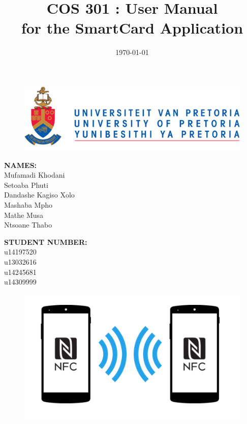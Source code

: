 \documentclass[english]{article}
\title{COS 301 : User Manual\\
	for the SmartCard Application\\
	}
\date{\today}
\begin{document}
	\maketitle
	\begin{figure}[!t]
		\includegraphics{up_logo.png}
	\end{figure}
	\begin{minipage}{0.4\textwidth}
		\begin{flushleft} \large
			\textbf{NAMES:}\\[0.4cm]
			Mufamadi {Khodani} \\
			Setoaba {Phuti} \\
			Dandashe {Kagiso Xolo} \\
			Mashaba {Mpho} \\
			Mathe {Musa} \\
			Ntsoane {Thabo}\\
		\end{flushleft}
	\end{minipage}
	\begin{minipage}{0.4\textwidth}
		\begin{flushright} \large
			\textbf{STUDENT NUMBER:} \\[0.4cm]
			u14197520 \\
			u13032616 \\
			u14245681 \\
			u14309999 \\
		\end{flushright}
\end{minipage}

	
	\newpage

	\tableofcontents
	

	
\newpage
	\begin{figure}[!t]
		\centering
		\includegraphics[scale=0.6]{NFC.png}
	\end{figure}
\end{document}

